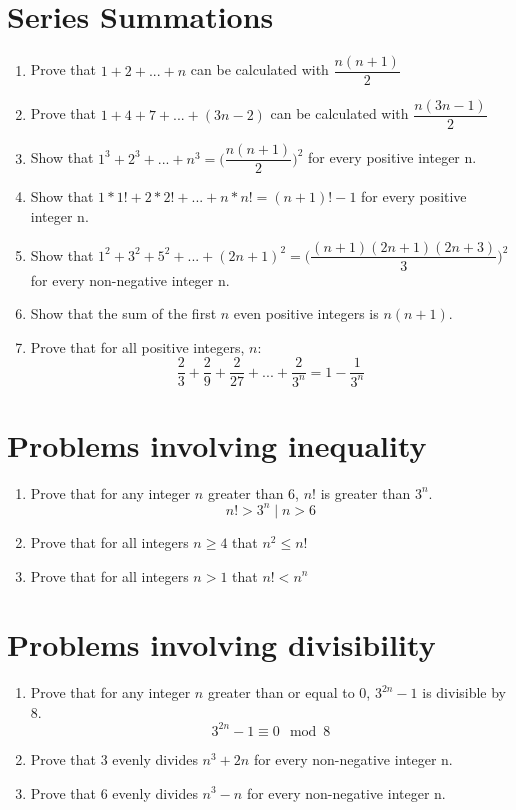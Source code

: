 \documentclass{article}
\begin{document}
\section{Series Summations}
\begin{enumerate}
\item Prove that \( 1 + 2 + ... + n \) can be calculated with \( \dfrac{n(n+1)}{2} \)

\item Prove that $ 1 + 4 + 7 + ... + (3n - 2) $ can be calculated with $ \dfrac{n(3n - 1)}{2} $

\item Show that \( 1^3+2^3+...+n^3= \Big( \dfrac{n(n+1)}{2} \Big)^2 \) for every positive integer n.

\item Show that \( 1*1! + 2*2!+...+n*n! = (n + 1)! - 1 \) for every positive integer n.

\item Show that \( 1^2 + 3^2 + 5^2 + ... + (2n + 1)^2=  \Big( \dfrac{(n + 1)(2n + 1)(2n + 3)}{3} \Big)^2 \) for every non-negative integer n.

\item Show that the sum of the first $n$ even positive integers is \( n(n + 1) \).

\item Prove that for all positive integers, $n$:
\[ \frac{2}{3} + \frac{2}{9} + \frac{2}{27} + ... + \frac{2}{3^n} = 1 - \frac{1}{3^n} \]
\end{enumerate}


\section{Problems involving inequality}
\begin{enumerate}
\item Prove that for any integer $n$ greater than 6, $n!$ is greater than $3^n$.
\[n! > 3^n \mid n > 6 \]

\item Prove that for all integers \( n \geq 4 \) that \( n^2 \leq n! \)

\item Prove that for all integers \( n > 1 \) that \( n! < n^n \)
\end{enumerate}


\section{Problems involving divisibility}
\begin{enumerate}
\item Prove that for any integer $n$ greater than or equal to 0, $3^{2n} - 1$ is divisible by 8.
\[ 3^{2n} - 1 \equiv 0 \mod 8 \]

\item Prove that 3 evenly divides \( n^3 + 2n \) for every non-negative integer n.

\item Prove that 6 evenly divides \( n^3 - n \) for every non-negative integer n.
\end{enumerate}
\end{document}
